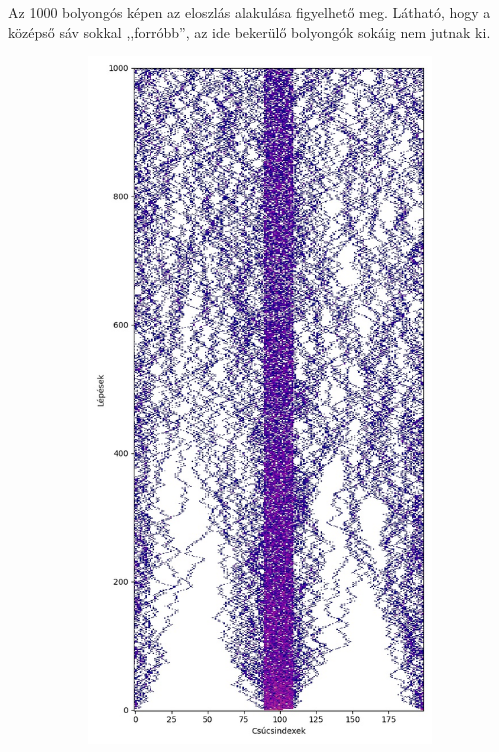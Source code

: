 Az 1000 bolyongós képen az eloszlás alakulása figyelhető meg. Látható, hogy a
középső sáv sokkal ,,forróbb'', az ide bekerülő bolyongók sokáig nem jutnak ki.

\begin{figure}[H]
  \centering
  \begin{subfigure}{.4\linewidth}
    \centering
    \includegraphics[width=\linewidth]{./figures/sulyzo/sim02.jpg}

\end{subfigure}
\end{figure}

